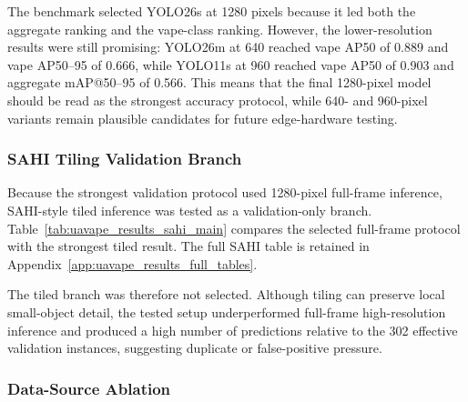 The benchmark selected YOLO26s at 1280 pixels because it led both the aggregate ranking and the vape-class ranking. However, the lower-resolution results were still promising: YOLO26m at 640 reached vape AP50 of 0.889 and vape AP50--95 of 0.666, while YOLO11s at 960 reached vape AP50 of 0.903 and aggregate mAP@50--95 of 0.566. This means that the final 1280-pixel model should be read as the strongest accuracy protocol, while 640- and 960-pixel variants remain plausible candidates for future edge-hardware testing.

\subsubsection{SAHI Tiling Validation Branch}

Because the strongest validation protocol used 1280-pixel full-frame inference, SAHI-style tiled inference was tested as a validation-only branch. Table~\ref{tab:uavape_results_sahi_main} compares the selected full-frame protocol with the strongest tiled result. The full SAHI table is retained in Appendix~\ref{app:uavape_results_full_tables}.

\begin{table}[H]
\centering
\scriptsize
{}
\caption{Comparison between the selected full-frame validation protocol and the strongest tested SAHI branch.}
\label{tab:uavape_results_sahi_main}
\end{table}

The tiled branch was therefore not selected. Although tiling can preserve local small-object detail, the tested setup underperformed full-frame high-resolution inference and produced a high number of predictions relative to the 302 effective validation instances, suggesting duplicate or false-positive pressure.

\subsubsection{Data-Source Ablation}

